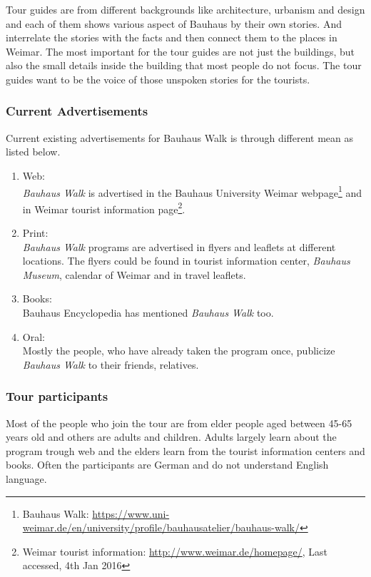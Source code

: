 Tour guides are from different backgrounds like architecture, urbanism and design and each of them shows various aspect of Bauhaus by their own stories. And interrelate the stories with the facts and then connect them to the places in Weimar. The most important for the tour guides are not just the buildings, but also the small details inside the building that most people do not focus. The tour guides want to be the voice of those unspoken stories for the tourists.


\subsubsection{Current Advertisements}
Current existing advertisements for Bauhaus Walk is through different mean as listed below.

\begin {enumerate}

\item	Web: \\
\emph{Bauhaus Walk} is advertised in the Bauhaus University Weimar webpage\footnote{Bauhaus Walk: \url{ https://www.uni-weimar.de/en/university/profile/bauhausatelier/bauhaus-walk/}} and in Weimar tourist information page\footnote{Weimar tourist information: \url{http://www.weimar.de/homepage/}, Last accessed, 4th Jan 2016}.

\item   Print: \\
\emph{Bauhaus Walk} programs are advertised in flyers and leaflets at different locations. The flyers could be found in tourist information center, \emph{Bauhaus Museum}, calendar of Weimar and in travel leaflets. 

\item   Books: \\
Bauhaus Encyclopedia has mentioned \emph{Bauhaus Walk} too. 

\item   Oral: \\
Mostly the people, who have already taken the program once, publicize \emph{Bauhaus Walk} to their friends, relatives.
\end{enumerate}

\subsubsection{Tour participants}
Most of the people who join the tour are from elder people aged between 45-65 years old and others are adults and children. Adults largely learn about the program trough web and the elders learn from the tourist information centers and books.  Often the participants are German and do not understand English language.


